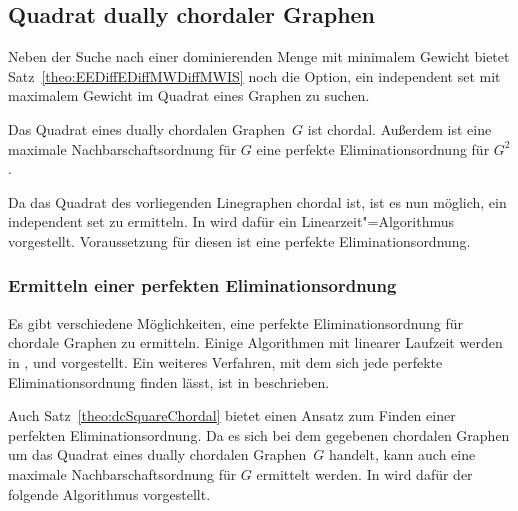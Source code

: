 \subsection{Quadrat dually chordaler Graphen}\label{sec:SquareDC}
Neben der Suche nach einer dominierenden Menge mit minimalem Gewicht bietet Satz~\ref{theo:EEDiffEDiffMWDiffMWIS} noch die Option, ein independent set mit maximalem Gewicht im Quadrat eines Graphen zu suchen.

\begin{Theorem}\label{theo:dcSquareChordal}
    \cite{Brandstaedt199843} Das Quadrat eines dually chordalen Graphen~$G$ ist chordal. Außerdem ist eine maximale Nachbarschaftsordnung für $G$ eine perfekte Eliminationsordnung für $G^2$.
\end{Theorem}

Da das Quadrat des vorliegenden Linegraphen chordal ist, ist es nun möglich, ein independent set zu ermitteln. In \cite{Frank1976} wird dafür ein Linearzeit"=Algorithmus vorgestellt. Voraussetzung für diesen ist eine perfekte Eliminationsordnung.

\subsubsection{Ermitteln einer perfekten Eliminationsordnung}
Es gibt verschiedene Möglichkeiten, eine perfekte Eliminationsordnung für chordale Graphen zu ermitteln. Einige Algorithmen mit linearer Laufzeit werden in \cite{Panda1996111}, \cite{Rose1976} und \cite{LinearTimeAcylicityTest} vorgestellt. Ein weiteres Verfahren, mit dem sich  jede perfekte Eliminationsordnung finden lässt, ist in \cite{Shier1984325} beschrieben.

Auch Satz~\ref{theo:dcSquareChordal} bietet einen Ansatz zum Finden einer perfekten Eliminationsordnung. Da es sich bei dem gegebenen chordalen Graphen um das Quadrat eines dually chordalen Graphen~$G$ handelt, kann auch eine maximale Nachbarschaftsordnung für $G$ ermittelt werden. In \cite{Brandstaedt199843} wird dafür der folgende Algorithmus vorgestellt. 

